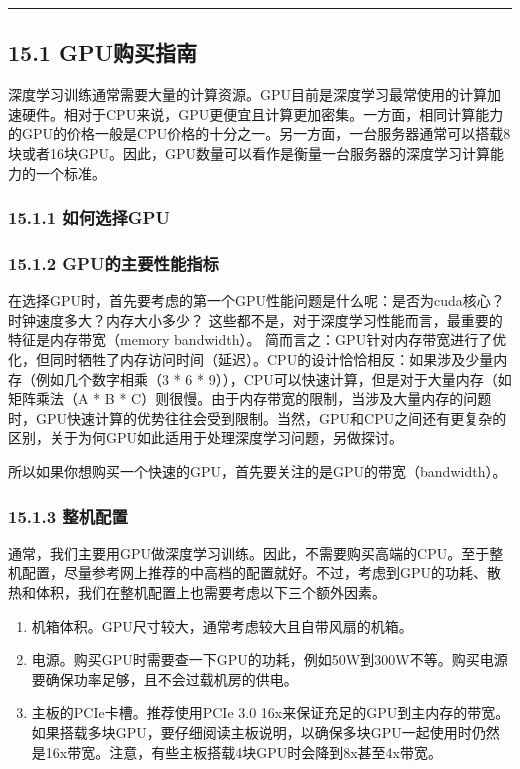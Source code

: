 \begin{center}\rule{0.5\linewidth}{\linethickness}\end{center}

\subsection{15.1 GPU购买指南}\label{gpuux8d2dux4e70ux6307ux5357}

深度学习训练通常需要大量的计算资源。GPU目前是深度学习最常使用的计算加速硬件。相对于CPU来说，GPU更便宜且计算更加密集。一方面，相同计算能力的GPU的价格一般是CPU价格的十分之一。另一方面，一台服务器通常可以搭载8块或者16块GPU。因此，GPU数量可以看作是衡量一台服务器的深度学习计算能力的一个标准。

\subsubsection{15.1.1 如何选择GPU}\label{ux5982ux4f55ux9009ux62e9gpu}

\subsubsection{15.1.2
GPU的主要性能指标}\label{gpuux7684ux4e3bux8981ux6027ux80fdux6307ux6807}

在选择GPU时，首先要考虑的第一个GPU性能问题是什么呢：是否为cuda核心？时钟速度多大？内存大小多少？
这些都不是，对于深度学习性能而言，最重要的特征是内存带宽（memory
bandwidth）。
简而言之：GPU针对内存带宽进行了优化，但同时牺牲了内存访问时间（延迟）。CPU的设计恰恰相反：如果涉及少量内存（例如几个数字相乘（3
* 6 * 9）），CPU可以快速计算，但是对于大量内存（如矩阵乘法（A * B *
C）则很慢。由于内存带宽的限制，当涉及大量内存的问题时，GPU快速计算的优势往往会受到限制。当然，GPU和CPU之间还有更复杂的区别，关于为何GPU如此适用于处理深度学习问题，另做探讨。

所以如果你想购买一个快速的GPU，首先要关注的是GPU的带宽（bandwidth）。

\subsubsection{15.1.3 整机配置}\label{ux6574ux673aux914dux7f6e}

通常，我们主要用GPU做深度学习训练。因此，不需要购买高端的CPU。至于整机配置，尽量参考网上推荐的中高档的配置就好。不过，考虑到GPU的功耗、散热和体积，我们在整机配置上也需要考虑以下三个额外因素。

\begin{enumerate}
\def\labelenumi{\arabic{enumi}.}
\item
  机箱体积。GPU尺寸较大，通常考虑较大且自带风扇的机箱。
\item
  电源。购买GPU时需要查一下GPU的功耗，例如50W到300W不等。购买电源要确保功率足够，且不会过载机房的供电。
\item
  主板的PCIe卡槽。推荐使用PCIe 3.0
  16x来保证充足的GPU到主内存的带宽。如果搭载多块GPU，要仔细阅读主板说明，以确保多块GPU一起使用时仍然是16x带宽。注意，有些主板搭载4块GPU时会降到8x甚至4x带宽。
\end{enumerate}

